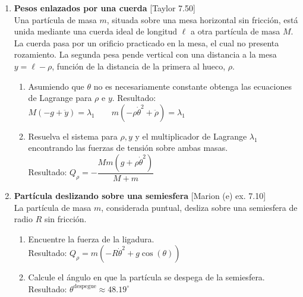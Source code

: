 \documentclass[11pt, spanish, a4paper, twoside]{article}
\begin{document}
\begin{enumerate}
	\newpage

	\item
	\begin{minipage}[t][7.5cm]{0.65\textwidth}
		\textbf{Pesos enlazados por una cuerda} [Taylor 7.50]\\
		Una partícula de masa \(m\), situada sobre una mesa horizontal sin fricción, está unida mediante una cuerda ideal de longitud \(\ell\) a otra partícula de masa \(M\).
		La cuerda pasa por un orificio practicado en la mesa, el cual no presenta rozamiento.
		La segunda pesa pende vertical con una distancia a la mesa \(y = \ell - \rho\), función de la distancia de la primera al hueco, \(\rho\).
		\begin{enumerate}
			\item Asumiendo que \(\theta\) no es necesariamente constante obtenga las ecuaciones de Lagrange para \(\rho\) e  \(y\). Resultado:\\[5 pt]
			\(M \left(- g + \ddot{y}\right) = \lambda_{1} \qquad m \left(- \rho \dot{\theta}^{2} + \ddot{\rho}\right) = \lambda_{1}\)
			\item Resuelva el sistema para \(\rho, y\) y el multiplicador de Lagrange \(\lambda_1\) encontrando las fuerzas de tensión sobre ambas masas.\\[5 pt]
			Resultado: \(Q_{\rho} = - \dfrac{M m \left(g + \rho \dot{\theta}^{2}\right)}{M + m}\)
		\end{enumerate}
	\end{minipage}
	\begin{minipage}[c][-1cm][t]{0.3\textwidth}
		
	\end{minipage}


	\item
	\begin{minipage}[t][4.5cm]{0.62\textwidth}
		\textbf{Partícula deslizando sobre una semiesfera} [Marion (e) ex. 7.10]\\
		La partícula de masa \(m\), considerada puntual, desliza sobre una semiesfera de radio \(R\) sin fricción.
		\begin{enumerate}
			\item Encuentre la fuerza de la ligadura.\\
			Resultado: \(Q_{\rho} = m \left(- R \dot{\theta}^{2} + g \cos{\left(\theta \right)}\right)\)
			\item Calcule el ángulo en que la partícula se despega de la semiesfera.\\
			Resultado: \(\theta^\mathrm{despegue} \approx 48.19^\circ\) 
		\end{enumerate}
	\end{minipage}
	\begin{minipage}[c][0cm][t]{0.3\textwidth}
		
	\end{minipage}
	

\end{enumerate}
\end{document}
